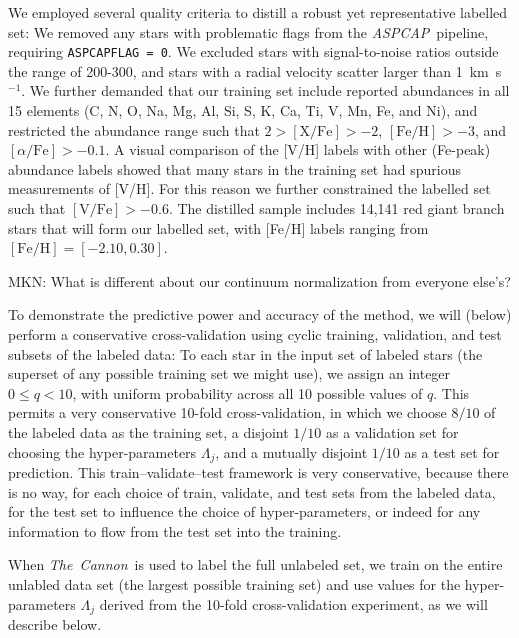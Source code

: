 \documentclass[12pt,preprint]{aastex}
\newcommand{\project}[1]{\textsl{#1}}
\newcommand{\TheCannon}{\project{The~Cannon}}
\newcommand{\acronym}[1]{{\small{#1}}}
\newcommand{\aspcap}{\project{\acronym{ASPCAP}}}
\begin{document}
We employed several quality criteria to distill a robust yet representative 
labelled set: We removed any stars with problematic flags from the \aspcap\
pipeline, requiring \texttt{ASPCAPFLAG = 0}.  We excluded stars with 
signal-to-noise ratios outside the range of 200-300, and stars with a radial 
velocity scatter larger than 1~km~s$^{-1}$.  We further demanded that
our training set include reported abundances in all 15 elements (C, N, O, Na, 
Mg, Al, Si, S, K, Ca, Ti, V, Mn, Fe, and Ni), and restricted the abundance range
such that $2 > \mathrm{[X/Fe]} > -2$, $\mathrm{[Fe/H]} > -3$, and 
$[\alpha/\mathrm{Fe}] > -0.1$.  A visual comparison of the [V/H] labels
with other (Fe-peak) abundance labels showed that many stars in the training set had
spurious measurements of [V/H]. For this reason we further constrained the
labelled set such that $\mathrm{[V/Fe]} > -0.6$.  The distilled sample
includes 14,141 red giant branch stars that will form our labelled set, with [Fe/H] labels ranging from
$\mathrm{[Fe/H]} = [-2.10, 0.30]$. 


MKN: What is different about our continuum normalization from everyone else's?



To demonstrate the predictive power and accuracy of the method, we
will (below) perform a conservative cross-validation using cyclic
training, validation, and test subsets of the labeled data:
To each star in the input set of labeled stars (the superset of any
possible training set we might use), we assign an integer $0\leq
q<10$, with uniform probability across all 10 possible values of $q$.
This permits a very conservative 10-fold cross-validation, in which we
choose $8/10$ of the labeled data as the training set, a disjoint
$1/10$ as a validation set for choosing the hyper-parameters
$\Lambda_j$, and a mutually disjoint $1/10$ as a test set for
prediction.
This train--validate--test framework is very conservative, because there
is no way, for each choice of train, validate, and test sets from the
labeled data, for the test set to influence the choice of
hyper-parameters, or indeed for any information to flow from the test
set into the training.

When \TheCannon\ is used to label the full unlabeled set, we train on
the entire unlabled data set (the largest possible training set) and
use values for the hyper-parameters $\Lambda_j$ derived from the
10-fold cross-validation experiment, as we will describe below.
\end{document}
